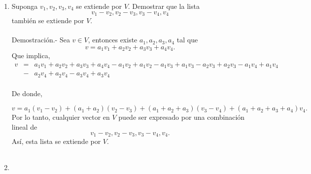 \begin{enumerate}[\bfseries 1.]

    \item Suponga $v_1,v_2,v_3,v_4$ se extiende por $V$. Demostrar que la lista 
    $$v_1-v_2,v_2-v_3,v_3-v_4,v_4$$
    también se extiende por $V$.\\\\
	Demostración.-\; Sea $v\in V$, entonces existe $a_1,a_2,a_3,a_4$ tal que 
	$$v=a_1v_1+a_2v_2+a_3v_3+a_4v_4.$$
	Que implica,
	$$
	\begin{array}{rcl}
	    v&=&a_1v_1+a_2v_2+a_3v_3+a_4v_4-a_1v_2+a_1v_2-a_1v_3+a_1v_3-a_2v_3+a_2v_3-a_1v_4+a_1v_4\\
	     &-& a_2v_4+a_2v_4 -a_3v_4 +a_3v_4\\
	\end{array}
	$$

	De donde,

	$$v=a_1(v_1-v_2)+(a_1+a_2)(v_2-v_3)+(a_1+a_2+a_3)(v_3-v_4)+(a_1+a_2+a_3+a_4)v_4.$$
	Por lo tanto, cualquier vector en $V$ puede ser expresado por una combinación lineal de 
	$$v_1-v_2,v_2-v_3,v_3-v_4,v_4.$$
	Así, esta lista se extiende por $V$.\\\\

    \item 

\end{enumerate}
